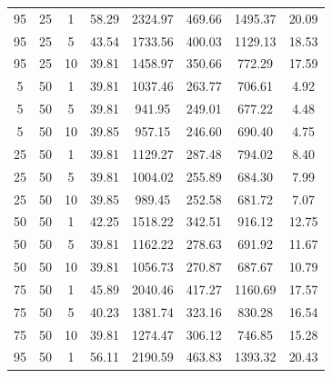 \begin{table}[H]
\begin{tabular}{ccc|c|c|c|c|c}
95 & 25 & 1 & \cellcolor{gray!1}58.29 & \cellcolor{gray!1}2324.97 & \cellcolor{gray!1}469.66 & \cellcolor{gray!1}1495.37 & 20.09\\
95 & 25 & 5 & \cellcolor{gray!13}43.54 & \cellcolor{gray!1}1733.56 & \cellcolor{gray!1}400.03 & \cellcolor{gray!1}1129.13 & 18.53\\
95 & 25 & 10 & \cellcolor{gray!50}39.81 & \cellcolor{gray!1}1458.97 & \cellcolor{gray!1}350.66 & \cellcolor{gray!16}772.29 & 17.59\\
5 & 50 & 1 & \cellcolor{gray!50}39.81 & \cellcolor{gray!1}1037.46 & \cellcolor{gray!1}263.77 & \cellcolor{gray!36}706.61 & 4.92\\
5 & 50 & 5 & \cellcolor{gray!50}39.81 & \cellcolor{gray!14}941.95 & \cellcolor{gray!1}249.01 & \cellcolor{gray!45}677.22 & 4.48\\
5 & 50 & 10 & \cellcolor{gray!50}39.85 & \cellcolor{gray!12}957.15 & \cellcolor{gray!1}246.60 & \cellcolor{gray!41}690.40 & 4.75\\
25 & 50 & 1 & \cellcolor{gray!50}39.81 & \cellcolor{gray!1}1129.27 & \cellcolor{gray!1}287.48 & \cellcolor{gray!9}794.02 & 8.40\\
25 & 50 & 5 & \cellcolor{gray!50}39.81 & \cellcolor{gray!4}1004.02 & \cellcolor{gray!1}255.89 & \cellcolor{gray!43}684.30 & 7.99\\
25 & 50 & 10 & \cellcolor{gray!50}39.85 & \cellcolor{gray!7}989.45 & \cellcolor{gray!1}252.58 & \cellcolor{gray!44}681.72 & 7.07\\
50 & 50 & 1 & \cellcolor{gray!26}42.25 & \cellcolor{gray!1}1518.22 & \cellcolor{gray!1}342.51 & \cellcolor{gray!1}916.12 & 12.75\\
50 & 50 & 5 & \cellcolor{gray!50}39.81 & \cellcolor{gray!1}1162.22 & \cellcolor{gray!1}278.63 & \cellcolor{gray!41}691.92 & 11.67\\
50 & 50 & 10 & \cellcolor{gray!50}39.81 & \cellcolor{gray!1}1056.73 & \cellcolor{gray!1}270.87 & \cellcolor{gray!42}687.67 & 10.79\\
75 & 50 & 1 & \cellcolor{gray!1}45.89 & \cellcolor{gray!1}2040.46 & \cellcolor{gray!1}417.27 & \cellcolor{gray!1}1160.69 & 17.57\\
75 & 50 & 5 & \cellcolor{gray!46}40.23 & \cellcolor{gray!1}1381.74 & \cellcolor{gray!1}323.16 & \cellcolor{gray!1}830.28 & 16.54\\
75 & 50 & 10 & \cellcolor{gray!50}39.81 & \cellcolor{gray!1}1274.47 & \cellcolor{gray!1}306.12 & \cellcolor{gray!24}746.85 & 15.28\\
95 & 50 & 1 & \cellcolor{gray!1}56.11 & \cellcolor{gray!1}2190.59 & \cellcolor{gray!1}463.83 & \cellcolor{gray!1}1393.32 & 20.43\\

\end{tabular}
\end{table}
